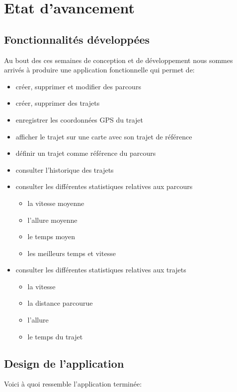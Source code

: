 \chapter{Etat d'avancement}
\section{Fonctionnalités développées}
Au bout des ces semaines de conception et de développement nous sommes arrivés à produire une application fonctionnelle qui permet de:\bigskip

\begin{itemize}
 	\item créer, supprimer et modifier des parcours
 	\item créer, supprimer des trajets
 	\item enregistrer les coordonnées GPS du trajet 
 	\item afficher le trajet sur une carte avec son trajet de référence
 	\item définir un trajet comme référence du parcours
	\item consulter l'historique des trajets 
	\item consulter les différentes statistiques relatives aux parcours 
	\begin{itemize}
		\item la vitesse moyenne
		\item l'allure moyenne
		\item le temps moyen 
		\item les meilleurs temps et vitesse 
	\end{itemize}
 	\item consulter les différentes statistiques relatives aux trajets 
	\begin{itemize}
		\item la vitesse
		\item la distance parcourue
		\item l'allure
		\item le temps du trajet 
	\end{itemize}
\end{itemize}\bigskip

\newpage

\section{Design de l'application}
Voici à quoi ressemble l'application terminée:\bigskip 

